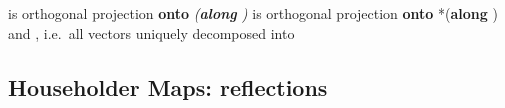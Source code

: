 \begin{itemize}

      \vItem
            is orthogonal projection \textbf{onto} 
            \emph{(\textbf{along} )}
      \vItem
            is orthogonal projection \textbf{onto}  *(\textbf{along}
            )
      \vItem
            and
      \vItem
            ,
            i.e.~all vectors  uniquely
            decomposed into
\end{itemize}


\subsection*{Householder Maps: reflections}

